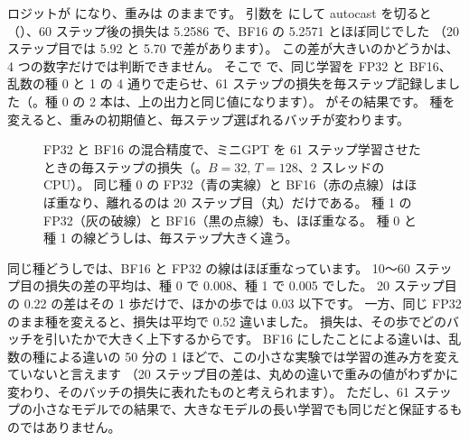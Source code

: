 ロジットが  になり、重みは  のままです。
引数を  にして autocast を切ると（）、60 ステップ後の損失は 5.2586 で、BF16 の 5.2571 とほぼ同じでした
（20 ステップ目では 5.92 と 5.70 で差があります）。
この差が大きいのかどうかは、4 つの数字だけでは判断できません。
そこで  で、同じ学習を FP32 と BF16、乱数の種 0 と 1 の 4 通りで走らせ、61 ステップの損失を毎ステップ記録しました（。種 0 の 2 本は、上の出力と同じ値になります）。
がその結果です。
種を変えると、重みの初期値と、毎ステップ選ばれるバッチが変わります。

\begin{figure}[!tbp]
\centering
{}
\caption{FP32 と BF16 の混合精度で、ミニGPT を 61 ステップ学習させたときの毎ステップの損失（。$B=32$, $T=128$、2 スレッドの CPU）。
同じ種 0 の FP32（青の実線）と BF16（赤の点線）はほぼ重なり、離れるのは 20 ステップ目（丸）だけである。
種 1 の FP32（灰の破線）と BF16（黒の点線）も、ほぼ重なる。
種 0 と種 1 の線どうしは、毎ステップ大きく違う。}
\label{fig:gpu-amp-curves}
\end{figure}

同じ種どうしでは、BF16 と FP32 の線はほぼ重なっています。
10〜60 ステップ目の損失の差の平均は、種 0 で 0.008、種 1 で 0.005 でした。
20 ステップ目の 0.22 の差はその 1 歩だけで、ほかの歩では 0.03 以下です。
一方、同じ FP32 のまま種を変えると、損失は平均で 0.52 違いました。
損失は、その歩でどのバッチを引いたかで大きく上下するからです。
BF16 にしたことによる違いは、乱数の種による違いの 50 分の 1 ほどで、この小さな実験では学習の進み方を変えていないと言えます
（20 ステップ目の差は、丸めの違いで重みの値がわずかに変わり、そのバッチの損失に表れたものと考えられます）。
ただし、61 ステップの小さなモデルでの結果で、大きなモデルの長い学習でも同じだと保証するものではありません。

